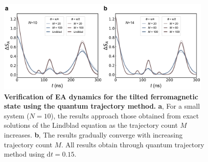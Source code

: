 \documentclass[reprint,superscriptaddress,preprintnumbers,longbibliography,
amsmath,amssymb,aps,floatfix,pra,twocolumn, tightenlines %
]{revtex4-2}
\begin{document}
    \begin{figure}[h]
    \centering
    \includegraphics[width=0.95\textwidth]{suppFig/plot_state_traj.pdf}
    \caption{\textbf{Verification of EA dynamics for the tilted ferromagnetic state using the quantum trajectory method.} \textbf{a}, For a small system (\( N = 10 \)), the results approach those obtained from exact solutions of the Lindblad equation as the trajectory count \( M \) increases. \textbf{b}, The results gradually converge with increasing trajectory count \( M \). All results obtain through quantum trajectory method using \( \mathrm{d}t = 0.15 \).}
    
    \label{state_traj}
    \end{figure}
    

    

%
	
\end{document}
